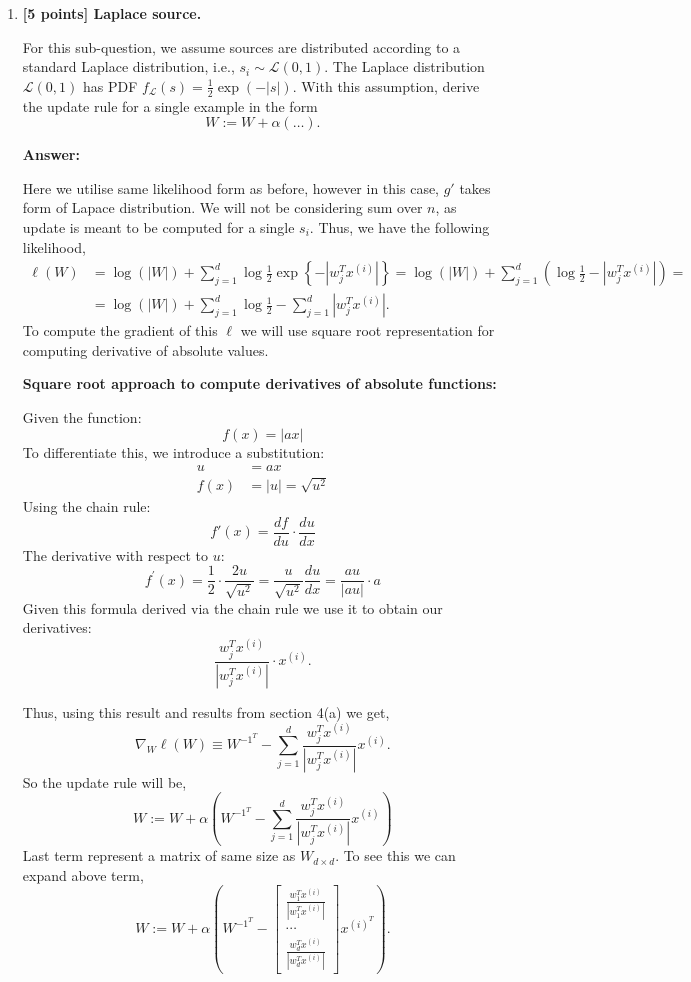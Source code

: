 \documentclass{article}
\begin{document}
\begin{enumerate}[label=(\alph*)]


\item \textbf{[5 points] Laplace source.} 

For this sub-question, we assume sources are distributed according to a standard Laplace
distribution, i.e., $s_i \sim \mathcal{L}(0, 1)$. The Laplace distribution $\mathcal{L}(0, 1)$ has PDF $f_\mathcal{L}(s) = \frac{1}{2} \exp(-|s|)$. With this assumption, derive the update rule for a single example in the form
\[ W := W + \alpha (\ldots) . \]



\textbf{Answer:}

Here we utilise same likelihood form as before, however in this case, $g'$ takes form of Lapace distribution. We will not be considering sum over $n$, as update is meant to be computed for a single $s_i$. Thus, we have the following likelihood,
\begin{align*}
\ell(W) & = \log(|W|) + \sum_{j=1}^{d}\log\frac{1}{2}\exp\left\{-|w^T_{j}x^{(i)}|\right\} =  \log(|W|) + \sum_{j=1}^{d}\left(\log\frac{1}{2}  - |w^T_{j}x^{(i)}|\right)=\\
& = \log(|W|) + \sum_{j=1}^{d}\log\frac{1}{2} - \sum_{j=1}^{d}|w^T_{j}x^{(i)}|.
\end{align*}
To compute the gradient of this $\ell$ we will use square root representation for computing derivative of absolute values.


\textbf{Square root approach to compute derivatives of absolute functions:}
\begin{tcolorbox}[colback=gray!20!white,colframe=gray!50!black]
Given the function:
\[ f(x) = |ax| \]
To differentiate this, we introduce a substitution:
\begin{align*}
u &= ax\\
f(x) &= |u| = \sqrt{u^2}
\end{align*}
Using the chain rule:
\[ f'(x) = \frac{df}{du} \cdot \frac{du}{dx} \]
The derivative with respect to \(u\):
\[ f^{\prime}(x) = \frac{1}{2} \cdot \frac{2u}{\sqrt{u^2}} = \frac{u}{\sqrt{u^2}}\frac{du}{dx} = \frac{au}{|au|}\cdot a \]
Given this formula derived via the chain rule we use it to obtain our derivatives:
\[
\frac{w^T_j x^{(i)}}{|w^T_j x^{(i)}|} \cdot x^{(i)}. \]
\end{tcolorbox}
Thus, using this result and results from section 4(a) we get,
\[
\nabla_W\ell(W)\equiv W^{-1^T} - \sum_{j=1}^{d} \frac{w^T_j x^{(i)}}{|w^T_j x^{(i)}|}x^{(i)}.
\]
So the update rule will be,
\[
W := W + \alpha\left(W^{-1^T} - \sum_{j=1}^{d} \frac{w^T_j x^{(i)}}{|w^T_j x^{(i)}|}x^{(i)}\right)
\]
Last term represent a matrix of same size as $W_{d\times d}$.  To see this we can expand above term,
\[
W := W + \alpha\left(W^{-1^T} -\begin{bmatrix}
\frac{w^T_1 x^{(i)}}{|w^T_1 x^{(i)}|}\\[8pt]
\cdots\\
\frac{w^T_d x^{(i)}}{|w^T_d x^{(i)}|}
\end{bmatrix}x^{(i)^T}\right).
\]


\end{enumerate}
\end{document}
